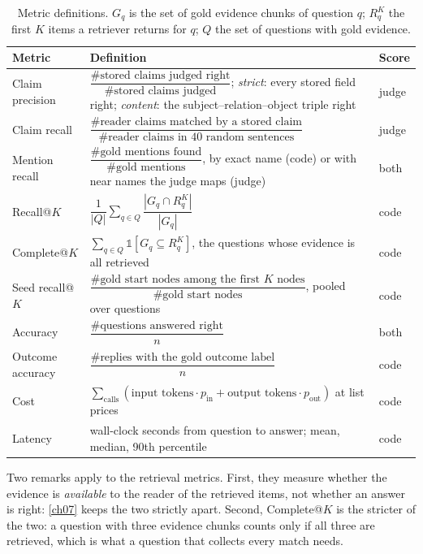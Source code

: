 \begin{table}[htbp]
\centering
\caption{Metric definitions. $G_q$ is the set of gold evidence chunks of question $q$; $R_q^K$ the first $K$
items a retriever returns for $q$; $Q$ the set of questions with gold evidence.}
\label{tab:metrics}
\small
\renewcommand{\arraystretch}{1.6}
\begin{tabularx}{\linewidth}{@{}lXl@{}}
\toprule
Metric & Definition & Score \\
\midrule
Claim precision & $\dfrac{\#\text{stored claims judged right}}{\#\text{stored claims judged}}$; \emph{strict}: every stored field right; \emph{content}: the subject--relation--object triple right & judge \\
Claim recall & $\dfrac{\#\text{reader claims matched by a stored claim}}{\#\text{reader claims in 40 random sentences}}$ & judge \\
Mention recall & $\dfrac{\#\text{gold mentions found}}{\#\text{gold mentions}}$, by exact name (code) or with near names the judge maps (judge) & both \\
Recall@$K$ & $\dfrac{1}{|Q|}\sum_{q \in Q} \dfrac{|G_q \cap R_q^K|}{|G_q|}$ & code \\
Complete@$K$ & $\sum_{q \in Q} \mathbb{1}\left[G_q \subseteq R_q^K\right]$, the questions whose evidence is all retrieved & code \\
Seed recall@$K$ & $\dfrac{\#\text{gold start nodes among the first } K \text{ nodes}}{\#\text{gold start nodes}}$, pooled over questions & code \\
Accuracy & $\dfrac{\#\text{questions answered right}}{n}$ & both \\
Outcome accuracy & $\dfrac{\#\text{replies with the gold outcome label}}{n}$ & code \\
Cost & $\sum_{\text{calls}} (\text{input tokens} \cdot p_{\text{in}} + \text{output tokens} \cdot p_{\text{out}})$ at list prices & code \\
Latency & wall-clock seconds from question to answer; mean, median, 90th percentile & code \\
\bottomrule
\end{tabularx}
\end{table}

Two remarks apply to the retrieval metrics. First, they measure whether the evidence is \emph{available} to
the reader of the retrieved items, not whether an answer is right: \cref{ch07} keeps the two strictly apart.
Second, Complete@$K$ is the stricter of the two: a question with three evidence chunks counts only if all three
are retrieved, which is what a question that collects every match needs.

